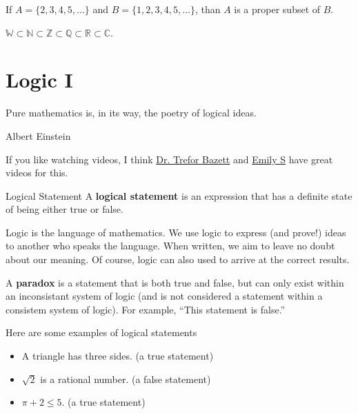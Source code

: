 \begin{boxexample}{}{}
	If $A=\{2,3,4,5,\dots\}$ and $B=\{1,2,3,4,5,\dots\}$, than $A$ is a proper subset of $B$.
\end{boxexample}

\begin{boxexample}{}{}
	$\mathbb{W} \subset \mathbb{N} \subset \mathbb{Z} \subset \mathbb{Q} \subset \mathbb{R} \subset \mathbb{C}$.
\end{boxexample}

\chapter{Logic I}

\epigraph{Pure mathematics is, in its way, the poetry of logical ideas.}{Albert Einstein}

If you like watching videos, I think \href{https://www.youtube.com/watch?v=q2eyZZK-OIk&t}{Dr. Trefor Bazett} and \href{https://www.youtube.com/watch?v=wRMC-ttjhwM}{Emily S} have great videos for this.

\begin{boxdefine}{Logical Statement}{}
A {\bf logical statement} is an expression that has a definite state of being either true or false.
\end{boxdefine}

Logic is the language of mathematics. We use logic to express (and prove!) ideas to another who speaks the language. When written, we aim to leave no doubt about our meaning. Of course, logic can also used to arrive at the correct results.

\begin{boxremark*}{}{}
	A {\bf paradox} is a statement that is both true and false, but can only exist within an inconsistant system of logic (and is not considered a statement within a consistem system of logic). For example, ``This statement is false.''
\end{boxremark*}

\begin{boxexample}{}{}
	Here are some examples of logical statements
	\begin{itemize}
		\item A triangle has three sides. (a true statement)
		\item $\sqrt 2$ is a rational number. (a false statement)
		\item $\pi + 2 \leq 5$. (a true statement)
	\end{itemize}
\end{boxexample}

